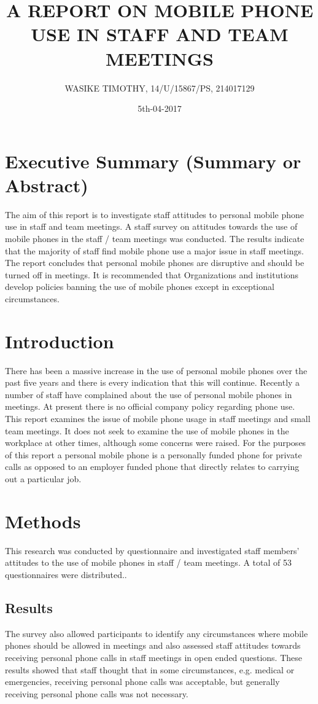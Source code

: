 \documentclass[12pt]{article}
\begin{document}
\title{ A REPORT ON MOBILE PHONE USE IN STAFF AND TEAM MEETINGS}
\author{WASIKE TIMOTHY,     14/U/15867/PS,     214017129}
\date{5th-04-2017}
\maketitle
\section{Executive Summary (Summary or Abstract) }
The aim of this report is to investigate staff attitudes to personal mobile phone use in staff and team meetings. A staff survey on attitudes towards the use of mobile phones in the staff / team meetings was conducted. The results indicate that the majority of staff find mobile phone use a major issue in staff meetings. The report concludes that personal mobile phones are disruptive and should be turned off in meetings. It is recommended that Organizations and institutions develop policies banning the use of mobile phones except in exceptional circumstances. 
\section{Introduction}
There has been a massive increase in the use of personal mobile phones over the past five years and there is every indication that this will continue.  Recently a number of staff have complained about the use of personal mobile phones in meetings. At present there is no official company policy regarding phone use. This report examines the issue of mobile phone usage in staff meetings and small team meetings. It does not seek to examine the use of mobile phones in the workplace at other times, although some concerns were raised. For the purposes of this report a personal mobile phone is a personally funded phone for private calls as opposed to an employer funded phone that directly relates to carrying out a particular job.
\section{Methods }
This research was conducted by questionnaire and investigated staff members’ attitudes to the use of mobile phones in staff / team meetings. A total of 53 questionnaires were distributed.. 
\subsection{Results}
The survey also allowed participants to identify any circumstances where mobile phones should be allowed in meetings and also assessed staff attitudes towards receiving personal phone calls in staff meetings in open ended questions. These results showed that staff thought that in some circumstances, e.g. medical or emergencies, receiving personal phone calls was acceptable, but generally receiving personal phone calls was not necessary. 
\end{document}
